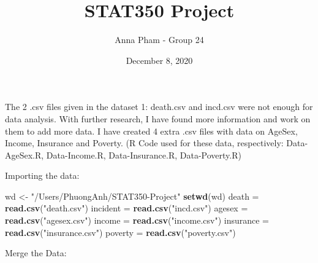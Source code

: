\documentclass[]{article}
\title{STAT350 Project}
\author{Anna Pham - Group 24}
\date{December 8, 2020}
\newenvironment{Shaded}{\begin{snugshade}}{\end{snugshade}}
\newcommand{\KeywordTok}[1]{\textcolor[rgb]{0.13,0.29,0.53}{\textbf{#1}}}
\newcommand{\NormalTok}[1]{#1}
\newcommand{\StringTok}[1]{\textcolor[rgb]{0.31,0.60,0.02}{#1}}
\begin{document}
\maketitle

The 2 .csv files given in the dataset 1: death.csv and incd.csv were not
enough for data analysis. With further research, I have found more
information and work on them to add more data. I have created 4 extra
.csv files with data on AgeSex, Income, Insurance and Poverty. (R Code
used for these data, respectively: Data-AgeSex.R, Data-Income.R,
Data-Insurance.R, Data-Poverty.R)

Importing the data:

\begin{Shaded}
\begin{Highlighting}[]
\NormalTok{wd <-}\StringTok{ "/Users/PhuongAnh/STAT350-Project"}
\KeywordTok{setwd}\NormalTok{(wd)}
\NormalTok{death =}\StringTok{ }\KeywordTok{read.csv}\NormalTok{(}\StringTok{"death.csv"}\NormalTok{)}
\NormalTok{incident =}\StringTok{ }\KeywordTok{read.csv}\NormalTok{(}\StringTok{"incd.csv"}\NormalTok{)}
\NormalTok{agesex =}\StringTok{ }\KeywordTok{read.csv}\NormalTok{(}\StringTok{"agesex.csv"}\NormalTok{)}
\NormalTok{income =}\StringTok{ }\KeywordTok{read.csv}\NormalTok{(}\StringTok{"income.csv"}\NormalTok{)}
\NormalTok{insurance =}\StringTok{ }\KeywordTok{read.csv}\NormalTok{(}\StringTok{"insurance.csv"}\NormalTok{)}
\NormalTok{poverty =}\StringTok{ }\KeywordTok{read.csv}\NormalTok{(}\StringTok{"poverty.csv"}\NormalTok{)}
\end{Highlighting}
\end{Shaded}

Merge the Data:
\end{document}
